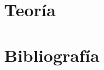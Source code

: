 \documentclass[a4paper]{article}
\begin{document}
\pagestyle{empty}


\pagestyle{plain}
\hyperblue

\part{Teoría}


\newpage
\part{Bibliografía}


\end{document}
